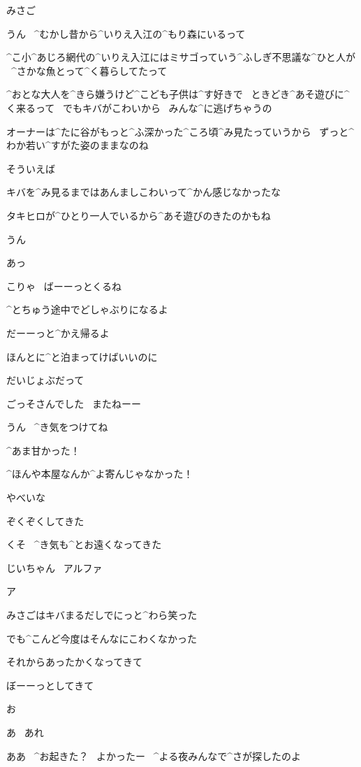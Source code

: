 \T みさご

\A うん
\ ^{むかし}{昔}から^{いりえ}{入江}の^{もり}{森}にいるって

\page
\A ^{こ}{小}^{あじろ}{網代}の^{いりえ}{入江}にはミサゴっていう^{ふしぎ}{不思議}な^{ひと}{人}が
\ ^{さかな}{魚}とって^{く}{暮}らしてたって

\A ^{おとな}{大人}を^{きら}{嫌}うけど^{こども}{子供}は^{す}{好}きで
\ ときどき^{あそ}{遊}びに^{く}{来}るって
\ でもキバがこわいから
\ みんな^{に}{逃}げちゃうの

\A オーナーは^{たに}{谷}がもっと^{ふ}{深}かった^{ころ}{頃}^{み}{見}たっていうから
\ ずっと^{わか}{若}い^{すがた}{姿}のままなのね

\page
\T そういえば

\T キバを^{み}{見}るまではあんましこわいって^{かん}{感}じなかったな

\A タキヒロが^{ひとり}{一人}でいるから^{あそ}{遊}びのきたのかもね

\T うん

\T あっ

\A こりゃ
\ ばーーっとくるね

\page
\A ^{とちゅう}{途中}でどしゃぶりになるよ

\T だーーっと^{かえ}{帰}るよ

\A ほんとに^{と}{泊}まってけばいいのに

\T だいじょぶだって

\T ごっそさんでした
\ またねーー

\A うん
\ ^{き}{気}をつけてね

\page
\T ^{あま}{甘}かった！

\T ^{ほんや}{本屋}なんか^{よ}{寄}んじゃなかった！

\page
\T やべいな

\T ぞくぞくしてきた

\T くそ
\ ^{き}{気}も^{とお}{遠}くなってきた

\T じいちゃん
\ アルファ

\T ア

\page[59]
\T みさごはキバまるだしでにっと^{わら}{笑}った

\T でも^{こんど}{今度}はそんなにこわくなかった

\T それからあったかくなってきて

\T ぼーーっとしてきて

\page
\T お

\T あ
\ あれ

\A ああ
\ ^{お}{起}きた？
\ よかったー
\ ^{よる}{夜}みんなで^{さが}{探}したのよ


